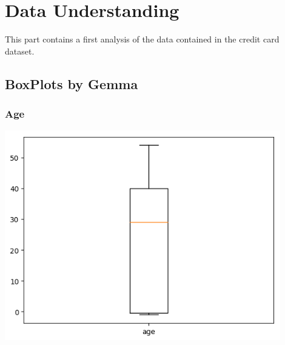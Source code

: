 \documentclass[a4paper]{article}
\begin{document}

\tableofcontents
\newpage




\section{Data Understanding}

This part contains a first analysis of the data contained in the credit card dataset.

\subsection{BoxPlots by Gemma}

\subsubsection{Age}
\includegraphics[width=0.9\textwidth]{../Code/boxPlotsGemma/boxplots/age.png}
\end{document}
